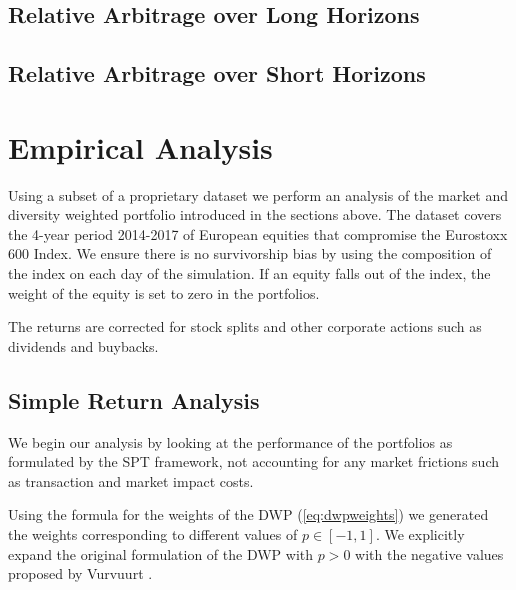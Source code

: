 \documentclass[british]{amsart} \usepackage{lmodern}
\numberwithin{equation}{section} \numberwithin{figure}{section}
\theoremstyle{plain} \newtheorem{thm}{\protect\theoremname}[section]
\theoremstyle{definition} \newtheorem{defn}[thm]{\protect\definitionname}
\theoremstyle{plain} \newtheorem{assumption}[thm]{\protect\assumptionname}
\theoremstyle{plain} \newtheorem{lem}[thm]{\protect\lemmaname}
\theoremstyle{plain} \newtheorem{prop}[thm]{\protect\propositionname}
\theoremstyle{remark} \newtheorem{rem}[thm]{\protect\remarkname}
\theoremstyle{plain} \newtheorem{cor}[thm]{\protect\corollaryname}
\begin{document}
\subsection{Relative Arbitrage over Long Horizons}


\subsection{Relative Arbitrage over Short Horizons}


\newpage
\section{Empirical Analysis}


Using a subset of a proprietary dataset we perform an analysis of the market and
diversity weighted portfolio introduced in the sections above. The dataset
covers the 4-year period 2014-2017 of European equities that compromise the
Eurostoxx 600 Index. We ensure there is no survivorship bias by using the
composition of the index on each day of the simulation. If an equity falls out
of the index, the weight of the equity is set to zero in the portfolios.

The returns are corrected for stock splits and other corporate actions such as
dividends and buybacks.

\subsection{Simple Return Analysis}

We begin our analysis by looking at the performance of the portfolios as
formulated by the SPT framework, not accounting for any market frictions such as
transaction and market impact costs.

Using the formula for the weights of the DWP (\ref{eq:dwpweights}) we generated
the weights corresponding to different values of $p \in [-1,1]$. We explicitly
expand the original formulation of the DWP with $p > 0$ \cite{fernholz2005} with
the negative values proposed by Vurvuurt \cite{vervuurt2015}.
\end{document}
